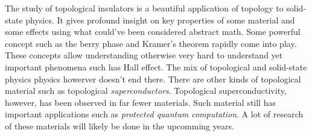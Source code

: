 The study of topological insulators is a beautiful application of topology to solid-state physics. It gives profound insight on key properties of some material and some effects using what could've been considered abstract math. Some powerful concept such as the berry phase and Kramer’s theorem rapidly come into play. These concepts allow understanding otherwise very hard to understand yet important phenomena such has Hall effect. The mix of topological and solid-state physics physics howerver doesn't end there. There are other kinds of topological material such as topological \textit{superconductors}. Topological superconductivity, however, has been observed in far fewer materials. Such material still has important applications such as \textit{protected quantum computation}. \cite{nayak_evidence_2021} A lot of research of these materials will likely be done in the upcomming years.